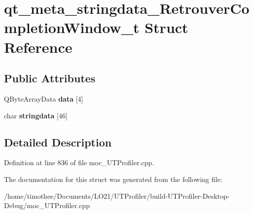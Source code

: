 \hypertarget{structqt__meta__stringdata___retrouver_completion_window__t}{\section{qt\-\_\-meta\-\_\-stringdata\-\_\-\-Retrouver\-Completion\-Window\-\_\-t Struct Reference}
\label{structqt__meta__stringdata___retrouver_completion_window__t}
}
\subsection*{Public Attributes}
\begin{DoxyCompactItemize}
\item 
\hypertarget{structqt__meta__stringdata___retrouver_completion_window__t_aea3d59f7bb53c9c2fccd944d0741d466}{Q\-Byte\-Array\-Data {\bfseries data} \mbox{[}4\mbox{]}}\label{structqt__meta__stringdata___retrouver_completion_window__t_aea3d59f7bb53c9c2fccd944d0741d466}

\item 
\hypertarget{structqt__meta__stringdata___retrouver_completion_window__t_a0ec59f2b31c3c86fe5a226768b092f34}{char {\bfseries stringdata} \mbox{[}46\mbox{]}}\label{structqt__meta__stringdata___retrouver_completion_window__t_a0ec59f2b31c3c86fe5a226768b092f34}

\end{DoxyCompactItemize}


\subsection{Detailed Description}


Definition at line 836 of file moc\-\_\-\-U\-T\-Profiler.\-cpp.



The documentation for this struct was generated from the following file\-:\begin{DoxyCompactItemize}
\item 
/home/timothee/\-Documents/\-L\-O21/\-U\-T\-Profiler/build-\/\-U\-T\-Profiler-\/\-Desktop-\/\-Debug/moc\-\_\-\-U\-T\-Profiler.\-cpp\end{DoxyCompactItemize}
